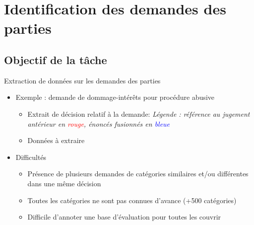 \section{Identification des demandes des parties}
\subsection{Objectif de la tâche}
\begin{frame}[c]{\mysubsectiontitle}
Extraction de données sur les demandes des parties
\begin{itemize} \scriptsize 
	\item Exemple : demande de dommage-intérêts pour procédure abusive
	\begin{itemize} \scriptsize 
		\item Extrait de décision relatif à la demande: 
	\textit{\tiny Légende : référence au jugement antérieur en \textcolor{red}{rouge}, énoncés fusionnés en \textcolor{blue}{bleue}}
    \item Données à extraire       
	\end{itemize}
\end{itemize}
 
 \vspace{-0.2cm}
 \begin{itemize} \scriptsize 
\item Difficultés
	\begin{itemize}\scriptsize 
		\item Présence de plusieurs demandes de catégories similaires et/ou différentes dans une même décision
		\item Toutes les catégories ne sont pas connues d'avance (+500 catégories)
		\item Difficile d'annoter une base d'évaluation pour toutes les couvrir
	\end{itemize}
\end{itemize}
\end{frame}

